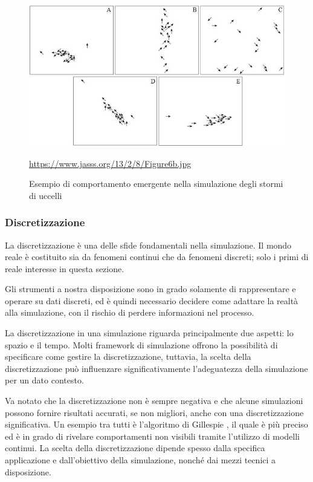 \begin{figure}[H]
    \begin{center}
        \includegraphics[scale=1]{img/Figure6b.jpg}
        \caption{Esempio di comportamento emergente nella simulazione degli stormi di uccelli}
        \url{https://www.jasss.org/13/2/8/Figure6b.jpg}
        \label{fig:flock_emergent_behaviour}
    \end{center}
\end{figure}

\subsubsection{Discretizzazione}

La discretizzazione è una delle sfide fondamentali nella simulazione. Il mondo reale è costituito sia da fenomeni continui che da fenomeni discreti; solo i primi di reale interesse in questa sezione.

Gli strumenti a nostra disposizione sono in grado solamente di rappresentare e operare su dati discreti, ed è quindi necessario decidere come adattare la realtà alla simulazione, con il rischio di perdere informazioni nel processo.

La discretizzazione in una simulazione riguarda principalmente 
due aspetti: lo spazio e il tempo. Molti framework di simulazione offrono 
la possibilità di specificare come gestire la discretizzazione, tuttavia, la scelta della discretizzazione può influenzare 
significativamente l'adeguatezza della simulazione per un dato contesto.

Va notato che la discretizzazione non è sempre negativa e che alcune 
simulazioni possono fornire risultati accurati, se non migliori, anche con una 
discretizzazione significativa. Un esempio tra tutti è l'algoritmo di Gillespie \cite{ref1}, il quale è più preciso ed è in grado di rivelare comportamenti non visibili tramite l'utilizzo di modelli continui. La scelta della discretizzazione 
dipende spesso dalla specifica applicazione e dall'obiettivo della simulazione, nonché dai mezzi tecnici a disposizione.

